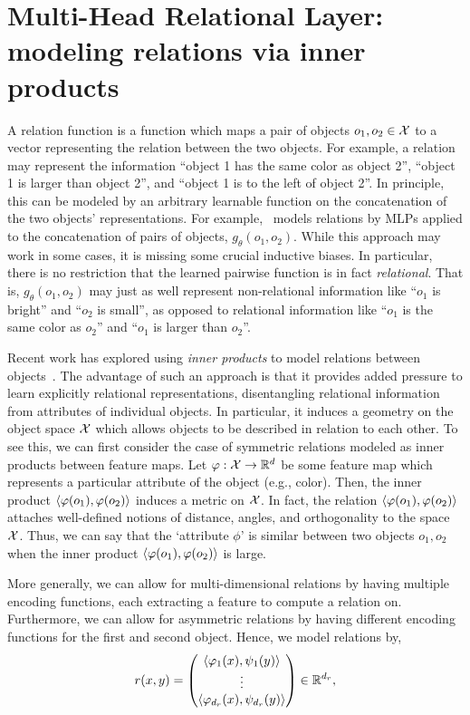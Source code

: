 \section{Multi-Head Relational Layer: modeling relations via inner products}\label{sec:mhr}

A relation function is a function which maps a pair of objects $o_1, o_2 \in {\mathcal{X}}$ to a vector representing the relation between the two objects. For example, a relation may represent the information ``object 1 has the same color as object 2'', ``object 1 is larger than object 2'', and ``object 1 is to the left of object 2''. In principle, this can be modeled by an arbitrary learnable function on the concatenation of the two objects' representations. For example,~\citep{santoroSimpleNeural2017} models relations by MLPs applied to the concatenation of pairs of objects, $g_\theta(o_1, o_2)$. While this approach may work in some cases, it is missing some crucial inductive biases. In particular, there is no restriction that the learned pairwise function is in fact \textit{relational}. That is, $g_\theta(o_1, o_2)$ may just as well represent non-relational information like ``$o_1$ is bright'' and ``$o_2$ is small'', as opposed to relational information like ``$o_1$ is the same color as $o_2$'' and ``$o_1$ is larger than $o_2$''.

Recent work has explored using \textit{inner products} to model relations between objects~\citep{webbEmergentSymbols2021, kergNeuralArchitecture2022, altabaaAbstractorsTransformer2023}. The advantage of such an approach is that it provides added pressure to learn explicitly relational representations, disentangling relational information from attributes of individual objects. In particular, it induces a geometry on the object space ${\mathcal{X}}$ which allows objects to be described in relation to each other. To see this, we can first consider the case of symmetric relations modeled as inner products between feature maps. Let $\varphi: {\mathcal{X}} \to \mathbb{R}^d$ be some feature map which represents a particular attribute of the object (e.g., color). Then, the inner product $\left \langle \varphi(o_1), \varphi(o_2) \right\rangle$ induces a metric on ${\mathcal{X}}$. In fact, the relation $\left \langle \varphi(o_1), \varphi(o_2) \right\rangle$ attaches well-defined notions of distance, angles, and orthogonality to the space ${\mathcal{X}}$. Thus, we can say that the `attribute $\phi$' is similar between two objects $o_1, o_2$ when the inner product $\left \langle \varphi(o_1), \varphi(o_2) \right\rangle$ is large.

More generally, we can allow for multi-dimensional relations by having multiple encoding functions, each extracting a feature to compute a relation on. Furthermore, we can allow for asymmetric relations by having different encoding functions for the first and second object. Hence, we model relations by,
\begin{equation}\label{eq:relation_function}
    r(x, y) = \begin{pmatrix}
        \left \langle \varphi_1(x), \psi_1(y) \right\rangle \\
        \vdots \\
        \left \langle \varphi_{d_r}(x), \psi_{d_r}(y) \right\rangle
    \end{pmatrix} \in \mathbb{R}^{d_r},
\end{equation}


